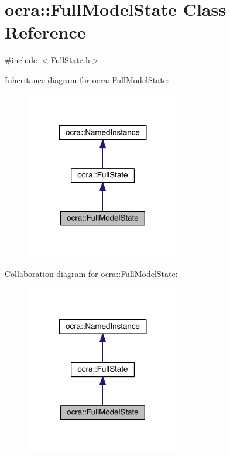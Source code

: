 \hypertarget{classocra_1_1FullModelState}{}\section{ocra\+:\+:Full\+Model\+State Class Reference}
\label{classocra_1_1FullModelState}


{\ttfamily \#include $<$Full\+State.\+h$>$}



Inheritance diagram for ocra\+:\+:Full\+Model\+State\+:\nopagebreak
\begin{figure}[H]
\begin{center}
\leavevmode
\includegraphics[width=191pt]{d1/dd5/classocra_1_1FullModelState__inherit__graph}
\end{center}
\end{figure}


Collaboration diagram for ocra\+:\+:Full\+Model\+State\+:\nopagebreak
\begin{figure}[H]
\begin{center}
\leavevmode
\includegraphics[width=191pt]{d6/d98/classocra_1_1FullModelState__coll__graph}
\end{center}
\end{figure}

